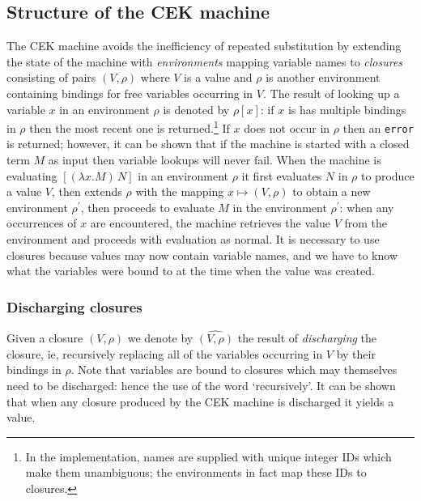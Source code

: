 \documentclass[a4paper]{article}
\newcommand\discharge[1]{\widehat{#1}}
\begin{document}
\begin{appendices}
\subsection{Structure of the CEK machine}
The CEK machine avoids the inefficiency of repeated substitution by
extending the state of the machine with
\textit{environments} mapping variable names to \textit{closures} consisting of
pairs $(V,\rho)$ where $V$ is a value and $\rho$ is another
environment containing bindings for free variables occurring in $V$.
The result of looking up a variable $x$ in an environment $\rho$ is
denoted by $\rho[x]$: if $x$ is has multiple bindings in $\rho$ then
the most recent one is returned.\footnote{In the implementation, names
are supplied with unique integer IDs which make them unambiguous; the
environments in fact map these IDs to closures.} If $x$ does not occur
in $\rho$ then an \texttt{error} is returned; however, it can be shown
that if the machine is started with a closed term $M$ as input then
variable lookups will never fail.  When the machine is evaluating
$[(\lambda x.M)\, N]$ in an environment $\rho$ it first evaluates $N$
in $\rho$ to produce a value $V$, then extends $\rho$ with the mapping
$x \mapsto (V,\rho)$ to obtain a new environment $\rho^{\prime}$, then
proceeds to evaluate $M$ in the environment $\rho^\prime$: when any
occurrences of $x$ are encountered, the machine retrieves the value
$V$ from the environment and proceeds with evaluation as normal.  It
is necessary to use closures because values may now contain variable
names, and we have to know what the variables were bound to at the
time when the value was created.

\subsubsection{Discharging closures}
Given a closure $(V,\rho)$ we denote by $\discharge{(V,\rho)}$ the
result of \textit{discharging} the closure, ie, recursively replacing
all of the variables occurring in $V$ by their bindings in
$\rho$. Note that variables are bound to closures which may themselves
need to be discharged: hence the use of the word `recursively'. It
can be shown that when any closure produced by the CEK machine is
discharged it yields a value.


\end{appendices}
\end{document}
